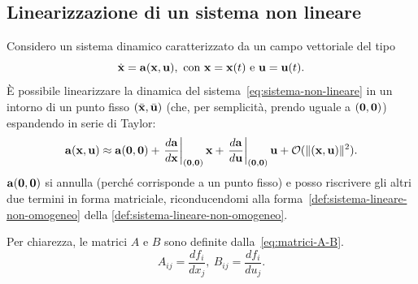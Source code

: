 \subsection{Linearizzazione di un sistema non lineare}
\label{subsec:linearizzazione}
Considero un sistema dinamico caratterizzato da un campo vettoriale del tipo
\begin{equation}
    \dot {\b x} = \b a(\b x, \b u),\ \text{con}\ \b x = \b x (t)\ \text e \ \b u = \b u (t).
    \label{eq:sistema-non-lineare}
\end{equation}
È possibile linearizzare la dinamica del sistema~\eqref{eq:sistema-non-lineare} in un intorno di un punto fisso
$(\bar{\mathbf{x}}, \bar{\mathbf{u}})$ (che, per semplicità, prendo uguale a $(\mathbf{0}, \mathbf{0})$) espandendo
in serie di Taylor:
\begin{equation}
    \mathbf{a}(\mathbf{x}, \mathbf{u}) \approx \mathbf{a}(\mathbf{0}, \mathbf{0}) +
    \left.\frac{d \mathbf{a}}{d \mathbf{x}}\right|_{(\mathbf{0}, \mathbf{0})} \mathbf{x} +
    \left.\frac{d \mathbf{a}}{d \mathbf{u}}\right|_{(\mathbf{0}, \mathbf{0})} \mathbf{u} + \mathcal O(\lVert(\mathbf{x}, \mathbf{u})\rVert^2).
    \label{eq:formula-linearizzazione}
\end{equation}
$\mathbf{a}(\mathbf{0}, \mathbf{0})$ si annulla (perché corrisponde a un punto fisso) e posso riscrivere
gli altri due termini in forma matriciale, riconducendomi alla forma~\eqref{def:sistema-lineare-non-omogeneo}
della \autoref{def:sistema-lineare-non-omogeneo}.

Per chiarezza, le matrici $A$ e $B$ sono definite dalla~\eqref{eq:matrici-A-B}.
\begin{equation}
    A_{ij} = \frac{df_i}{dx_j},\ B_{ij} = \frac{df_i}{du_j}.
    \label{eq:matrici-A-B}
\end{equation}

